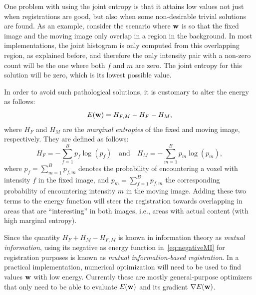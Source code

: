 \documentclass[10pt,twoside]{book}
\begin{document}
%
One problem with using the joint entropy is that it attains low values not just when registrations are good, but also when some non-desirable trivial solutions are found. As an example, consider the scenario where $\mathbf{w}$ is so that the fixed image and the moving image only overlap in a region in the background. In most implementations, the joint histogram is only computed from this overlapping region, as explained before, and therefore the only intensity pair with a non-zero count will be the one where both $f$ and $m$ are zero. The joint entropy for this solution will be zero, which is its lowest possible value.

In order to avoid such pathological solutions, it is customary to alter the energy as follows:
\begin{equation}
E(\mathbf{w}) = H_{F,M} - H_{F} - H_{M}
,
\label{eq:negativeMI}
\end{equation}
where $H_{F}$ and $H_{M}$ are the \emph{marginal entropies} of the fixed and moving image, respectively. 
They are defined as follows:
$$
H_{F} = -\sum_{f=1}^{B} p_f \log( p_f )
\quad
\text{and}
\quad
H_{M} = -\sum_{m=1}^{B} p_m \log( p_m ),
$$
where $p_f = \sum_{m=1}^B p_{f,m}$
denotes the probability of encountering a voxel 
with intensity $f$
in the fixed image, 
and $p_m = \sum_{f=1}^B p_{f,m}$
the corresponding probability of encountering intensity $m$ in the moving image.
%
Adding these two terms to the energy function will steer the registration towards overlapping in areas that are ``interesting'' in both images, i.e., areas with actual content (with high marginal entropy).

Since the quantity
$
H_{F} + H_{M} - H_{F,M}  
$
is known in information theory as \emph{mutual information}, using its negative as energy function in~\eqref{eq:negativeMI} for registration purposes is known as \emph{mutual information-based registration}.
%
In a practical implementation, numerical optimization will need to be used to find values $\mathbf{w}$ with low energy. Currently these are mostly general-purpose optimizers that only need to be able to evaluate $E(\mathbf{w})$ and its gradient $\nabla E(\mathbf{w})$.
\end{document}
